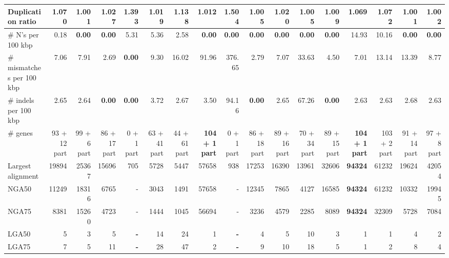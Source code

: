 \documentclass[12pt,a4paper]{article}
\begin{document}
\begin{table}[ht]
\begin{center}
\begin{tabular}{|l*{16}{|r}|}
Duplication ratio & 1.070 & {\bf 1.001} & 1.027 & 1.393 & 1.019 & 1.138 & 1.012 & 1.504 & 1.005 & 1.020 & 1.005 & 1.009 & 1.069 & 1.072 & {\bf 1.001} & 1.002 \\ \hline
\# N's per 100 kbp & 0.18 & {\bf 0.00} & {\bf 0.00} & 5.31 & 5.36 & 2.58 & {\bf 0.00} & {\bf 0.00} & {\bf 0.00} & {\bf 0.00} & {\bf 0.00} & {\bf 0.00} & 14.93 & 10.16 & {\bf 0.00} & {\bf 0.00} \\ \hline
\# mismatches per 100 kbp & 7.06 & 7.91 & 2.69 & {\bf 0.00} & 9.30 & 16.02 & 91.96 & 376.65 & 2.79 & 7.07 & 33.63 & 4.50 & 7.01 & 13.14 & 13.39 & 8.77 \\ \hline
\# indels per 100 kbp & 2.65 & 2.64 & {\bf 0.00} & {\bf 0.00} & 3.72 & 2.67 & 3.50 & 94.16 & {\bf 0.00} & 2.65 & 67.26 & {\bf 0.00} & 2.63 & 2.63 & 2.68 & 2.63 \\ \hline
\# genes & 93 + 12 part & 99 + 6 part & 86 + 17 part & 0 + 1 part & 63 + 41 part & 44 + 61 part & {\bf 104 + 1 part} & 0 + 1 part & 86 + 18 part & 89 + 16 part & 70 + 34 part & 89 + 15 part & {\bf 104 + 1 part} & 103 + 2 part & 91 + 14 part & 97 + 8 part \\ \hline
Largest alignment & 19894 & 25367 & 15696 & 705 & 5728 & 5447 & 57658 & 938 & 17253 & 16390 & 13961 & 32606 & {\bf 94324} & 61232 & 19624 & 42054 \\ \hline
NGA50 & 11249 & 18316 & 6765 & - & 3043 & 1491 & 57658 & - & 12345 & 7865 & 4127 & 16585 & {\bf 94324} & 61232 & 10332 & 19945 \\ \hline
NGA75 & 8381 & 15260 & 4723 & - & 1444 & 1045 & 56694 & - & 3236 & 4579 & 2285 & 8089 & {\bf 94324} & 32309 & 5728 & 7084 \\ \hline
LGA50 & 5 & 3 & 5 & {\bf -} & 14 & 24 & 1 & {\bf -} & 4 & 5 & 10 & 3 & 1 & 1 & 4 & 2 \\ \hline
LGA75 & 7 & 5 & 11 & {\bf -} & 28 & 47 & 2 & {\bf -} & 9 & 10 & 18 & 5 & 1 & 2 & 8 & 4 \\ \hline
\end{tabular}
\end{center}
\end{table}
\end{document}
